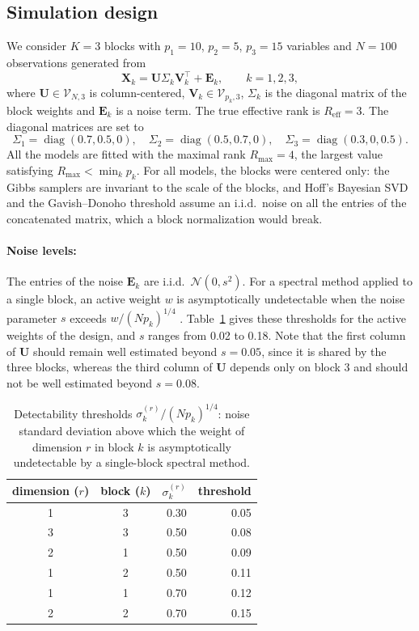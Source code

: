 \documentclass[11pt]{article}
\DeclareMathOperator{\diag}{diag}
\newcommand{\X}{\mathbf{X}}
\newcommand{\U}{\mathbf{U}}
\newcommand{\V}{\mathbf{V}}
\newcommand{\EE}{\mathbf{E}}
\newcommand{\Stiefel}[2]{\mathcal V_{#1,#2}}
\begin{document}
\subsection{Simulation design}
We consider $K=3$ blocks with $p_1=10$, $p_2=5$, $p_3=15$ variables and $N=100$ observations generated from
\[
  \X_k=\U\Sigma_k\V_k^\intercal+\EE_k,\qquad k=1,2,3,
\]
where $\U\in\Stiefel{N}{3}$ is column-centered, $\V_k\in\Stiefel{p_k}{3}$, $\Sigma_k$ is the diagonal matrix of the block weights and $\EE_k$ is a noise term. The true effective rank is $R_{\mathrm{eff}}=3$. The diagonal matrices are set to 
\[\Sigma_1=\diag(0.7,0.5,0), \quad \Sigma_2=\diag(0.5,0.7,0), \quad \Sigma_3=\diag(0.3,0,0.5).\] 
All the models are fitted with the maximal rank $R_{\max}=4$, the largest value satisfying $R_{\max}<\min_kp_k$. For all models, the blocks were centered only: the Gibbs samplers are invariant to the scale of the blocks, and Hoff's Bayesian SVD and the Gavish--Donoho threshold assume an i.i.d.\ noise on all the entries of the concatenated matrix, which a block normalization would break.
 
\paragraph{Noise levels:} The entries of the noise $\EE_k$ are i.i.d.\ $\mathcal{N}(0,s^2)$. For a spectral method applied to a single block, an active weight $w$ is asymptotically undetectable when the noise parameter $s$ exceeds $w/(Np_k)^{1/4}$ \cite[see][for details]{benaychgeorges2012}. 
Table~\ref{tab:thres} gives these thresholds for the active weights of the design, and $s$ ranges from 0.02 to 0.18. Note that the first column of $\U$ should remain well estimated beyond $s=0.05$, since it is shared by the three blocks, whereas the third column of $\U$ depends only on block 3 and should not be well estimated beyond $s=0.08$.    

\begin{table}[ht]
\centering
\begin{tabular}{ccrr}
  \hline
dimension ($r$) & block ($k$) & $\sigma_k^{(r)}$ & threshold \\ 
  \hline
1 & 3 & 0.30 & 0.05 \\ 
  3 & 3 & 0.50 & 0.08 \\ 
  2 & 1 & 0.50 & 0.09 \\ 
  1 & 2 & 0.50 & 0.11 \\ 
  1 & 1 & 0.70 & 0.12 \\ 
  2 & 2 & 0.70 & 0.15 \\ 
   \hline
\end{tabular}
\caption{Detectability thresholds $\sigma_k^{(r)}/(Np_k)^{1/4}$: noise standard deviation above which the weight of dimension $r$ in block $k$ is asymptotically undetectable by a single-block spectral method.\label{tab:thres}}
\end{table}
\end{document}
